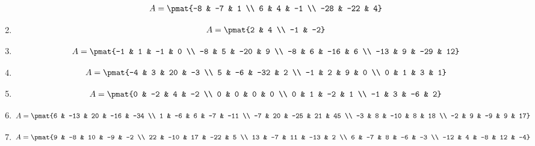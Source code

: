 \begin{enumerate}
\begin{align*}
A = \pmat{-8 & -7 & 1 \\ 6 & 4 & -1 \\ -28 & -22 & 4}
\end{align*}

\item

\begin{align*}
A = \pmat{2 & 4 \\ -1 & -2}
\end{align*}

\item

\begin{align*}
A = \pmat{-1 & 1 & -1 & 0 \\ -8 & 5 & -20 & 9 \\ -8 & 6 & -16 & 6 \\ -13 & 9 & -29 & 12}
\end{align*}

\item

\begin{align*}
A = \pmat{-4 & 3 & 20 & -3 \\ 5 & -6 & -32 & 2 \\ -1 & 2 & 9 & 0 \\ 0 & 1 & 3 & 1}
\end{align*}

\item

\begin{align*}
A = \pmat{0 & -2 & 4 & -2 \\ 0 & 0 & 0 & 0 \\ 0 & 1 & -2 & 1 \\ -1 & 3 & -6 & 2}
\end{align*}

\item

\begin{align*}
A = \pmat{6 & -13 & 20 & -16 & -34 \\ 1 & -6 & 6 & -7 & -11 \\ -7 & 20 & -25 & 21 & 45 \\ -3 & 8 & -10 & 8 & 18 \\ -2 & 9 & -9 & 9 & 17}
\end{align*}

\item

\begin{align*}
A = \pmat{9 & -8 & 10 & -9 & -2 \\ 22 & -10 & 17 & -22 & 5 \\ 13 & -7 & 11 & -13 & 2 \\ 6 & -7 & 8 & -6 & -3 \\ -12 & 4 & -8 & 12 & -4}
\end{align*}


\end{enumerate}
